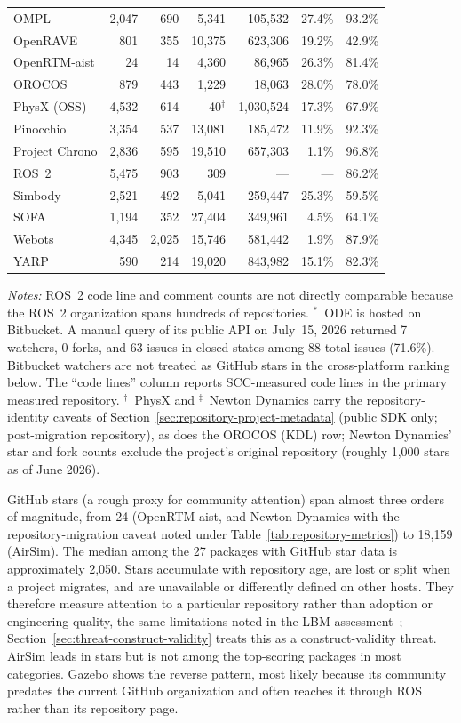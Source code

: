 \begin{table}[p]
\begin{tabular}{@{}p{2.2cm}rrrrrr@{}}
OMPL & 2,047 & 690 & 5,341 & 105,532 & 27.4\% & 93.2\% \\
OpenRAVE & 801 & 355 & 10,375 & 623,306 & 19.2\% & 42.9\% \\
OpenRTM-aist & 24 & 14 & 4,360 & 86,965 & 26.3\% & 81.4\% \\
OROCOS & 879 & 443 & 1,229 & 18,063 & 28.0\% & 78.0\% \\
PhysX (OSS) & 4,532 & 614 & 40$^\dagger$ & 1,030,524 & 17.3\% & 67.9\% \\
Pinocchio & 3,354 & 537 & 13,081 & 185,472 & 11.9\% & 92.3\% \\
Project Chrono & 2,836 & 595 & 19,510 & 657,303 & 1.1\% & 96.8\% \\
ROS~2 & 5,475 & 903 & 309 & --- & --- & 86.2\% \\
Simbody & 2,521 & 492 & 5,041 & 259,447 & 25.3\% & 59.5\% \\
SOFA & 1,194 & 352 & 27,404 & 349,961 & 4.5\% & 64.1\% \\
Webots & 4,345 & 2,025 & 15,746 & 581,442 & 1.9\% & 87.9\% \\
YARP & 590 & 214 & 19,020 & 843,982 & 15.1\% & 82.3\% \\
\bottomrule
\end{tabular}
\end{table}

\noindent\textit{Notes:} ROS~2 code line and comment counts are not directly comparable because the ROS~2 organization spans hundreds of repositories. $^*$~ODE is hosted on Bitbucket. A manual query of its public API on July~15, 2026 returned 7 watchers, 0 forks, and 63 issues in closed states among 88 total issues (71.6\%). Bitbucket watchers are not treated as GitHub stars in the cross-platform ranking below. The ``code lines'' column reports SCC-measured code lines in the primary measured repository. $^\dagger$~PhysX and $^\ddagger$~Newton Dynamics carry the repository-identity caveats of Section~\ref{sec:repository-project-metadata} (public SDK only; post-migration repository), as does the OROCOS (KDL) row; Newton Dynamics' star and fork counts exclude the project's original repository (roughly 1{,}000 stars as of June 2026).

GitHub stars (a rough proxy for community attention) span almost three orders of magnitude, from 24 (OpenRTM-aist, and Newton Dynamics with the repository-migration caveat noted under Table~\ref{tab:repository-metrics}) to 18,159 (AirSim). The median among the 27 packages with GitHub star data is approximately 2,050. Stars accumulate with repository age, are lost or split when a project migrates, and are unavailable or differently defined on other hosts. They therefore measure attention to a particular repository rather than adoption or engineering quality, the same limitations noted in the LBM assessment~\citep{Smith2024LBM}; Section~\ref{sec:threat-construct-validity} treats this as a construct-validity threat. AirSim leads in stars but is not among the top-scoring packages in most categories. Gazebo shows the reverse pattern, most likely because its community predates the current GitHub organization and often reaches it through ROS rather than its repository page.


